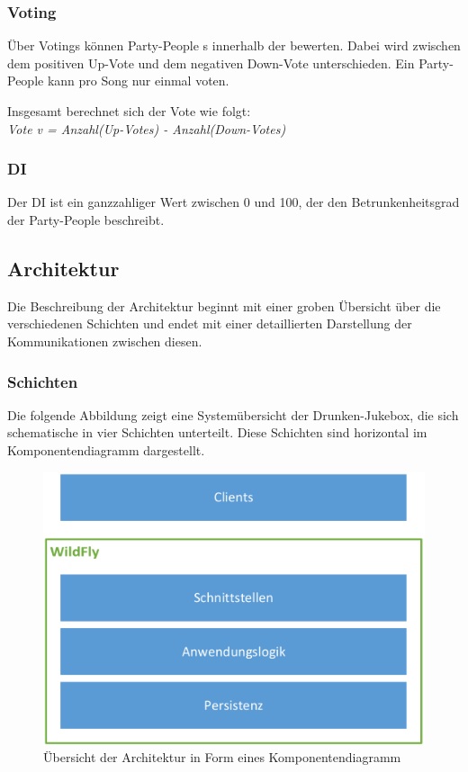 \subsubsection{Voting}
\label{sec:Voting}
Über Votings können Party-People s innerhalb der  bewerten. Dabei wird zwischen dem positiven Up-Vote und dem negativen Down-Vote unterschieden. Ein Party-People kann pro Song nur einmal voten.

Insgesamt berechnet sich der Vote wie folgt:\\
\textit{Vote v = Anzahl(Up-Votes) - Anzahl(Down-Votes)}

\subsubsection{DI}
\label{sec:DI}
Der DI ist ein ganzzahliger Wert zwischen 0 und 100, der den Betrunkenheitsgrad der Party-People beschreibt.

\subsection{Architektur}
\label{sec:Architektur}
Die Beschreibung der Architektur beginnt mit einer groben Übersicht über die verschiedenen Schichten und endet mit einer detaillierten Darstellung der Kommunikationen zwischen diesen.

\subsubsection{Schichten}
Die folgende Abbildung zeigt eine Systemübersicht der Drunken-Jukebox, die sich schematische in vier Schichten unterteilt. Diese Schichten sind horizontal im Komponentendiagramm dargestellt.

\begin{figure}[H]
	\centering
	\includegraphics[width=0.7\linewidth]{Bilder/Architektur}
	\caption{Übersicht der Architektur in Form eines Komponentendiagramm}
	\label{fig:Architekturdiagramm}
\end{figure}

